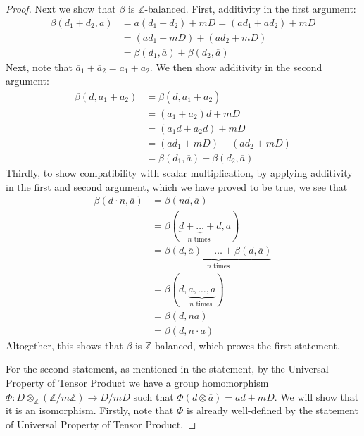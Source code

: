 \documentclass{article}
\theoremstyle{definition}
\newcommand{\Z}{{\mathbb Z}}
\newcommand{\ten}{\otimes_\Z}
\newcommand{\tens}{\otimes}
\renewcommand{\a}{\overline{a}}
\begin{document}
\begin{proof}
    Next we show that $\beta$ is $\Z$-balanced. First, additivity in the first argument:
    \begin{align*}
        \beta(d_1 + d_2, \a) 
        &= a(d_1 + d_2) + mD = (ad_1 + ad_2) + mD \\
        &= (ad_1 + mD) + (ad_2 + mD) \\
        &= \beta(d_1, \a) + \beta(d_2, \a)
    \end{align*}
    Next, note that $\a_1 + \a_2 = \overline{a_1 + a_2}$. We then show additivity in the second argument:
    \begin{align*}
        \beta(d, \a_1 + \a_2) 
        &= \beta(d, \overline{a_1 + a_2})\\
        &= (a_1+a_2)d + mD \\
        &= (a_1d + a_2d) + mD\\ 
        &= (ad_1 + mD) + (ad_2 + mD) \\
        &= \beta(d_1, \a) + \beta(d_2, \a)
    \end{align*}
    Thirdly, to show compatibility with scalar multiplication, by applying additivity in the first and second argument, which we have proved to be true, we see that
    \begin{align*}
        \beta(d\cdot n, \a) 
        &= \beta(nd, \a) \\
        &= \beta(\underbrace{d + \dots + d}_{n\text{ times }}, \a) \\
        &= \underbrace{\beta(d, \a) + \dots +  \beta(d, \a)}_{n \text{ times}} \\
        &= \beta(d, \underbrace{\a, \dots, \a}_{n\text{ times }}) \\
        &= \beta(d, n \a)\\
        &= \beta(d, n\cdot \a)
    \end{align*}
    Altogether, this shows that $\beta$ is $\Z$-balanced, which proves the first statement.

    For the second statement, as mentioned in the statement, by the Universal Property of Tensor Product we have a group homomorphism $\Phi: D\ten (\Z/m\Z)\to D/mD$ such that $\Phi(d \tens \a) = ad + mD$. We will show that it is an isomorphism. Firstly, note that $\Phi$ is already well-defined by the statement of Universal Property of Tensor Product.


\end{proof}
\end{document}
